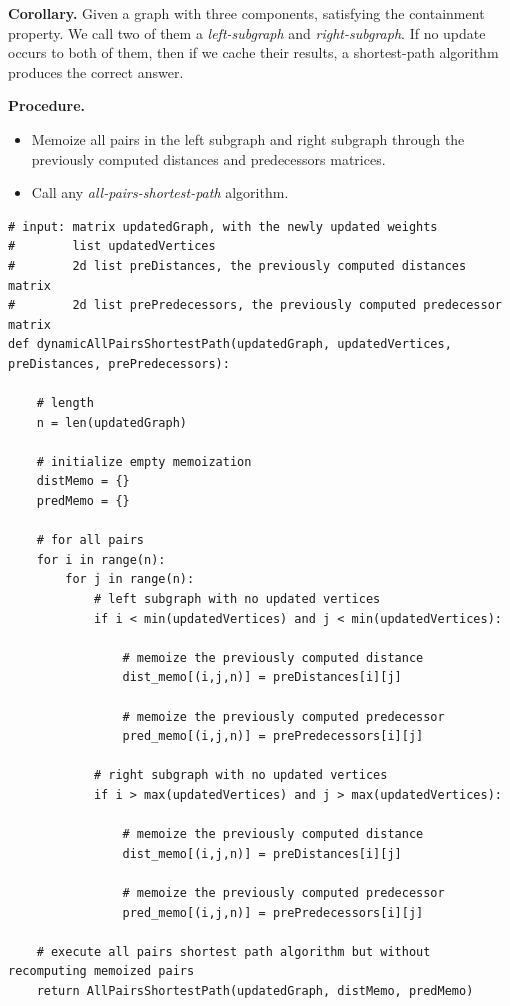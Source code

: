 \textbf{Corollary.} Given a graph with three components, satisfying the containment property. We call two of them a \textit{left-subgraph} and \textit{right-subgraph}. If no update occurs to both of them, then if we cache their results, a shortest-path algorithm produces the correct answer.

\textbf{Procedure.}
\begin{itemize}
    \item Memoize all pairs in the left subgraph and right subgraph through the previously computed distances and predecessors matrices.
    \item Call any \textit{all-pairs-shortest-path} algorithm.
\end{itemize}

\begin{verbatim}
# input: matrix updatedGraph, with the newly updated weights
#        list updatedVertices
#        2d list preDistances, the previously computed distances matrix
#        2d list prePredecessors, the previously computed predecessor matrix
def dynamicAllPairsShortestPath(updatedGraph, updatedVertices, preDistances, prePredecessors):
    
    # length
    n = len(updatedGraph)
    
    # initialize empty memoization
    distMemo = {}
    predMemo = {}
    
    # for all pairs
    for i in range(n):
        for j in range(n):
            # left subgraph with no updated vertices
            if i < min(updatedVertices) and j < min(updatedVertices):
            
                # memoize the previously computed distance
                dist_memo[(i,j,n)] = preDistances[i][j]
                
                # memoize the previously computed predecessor
                pred_memo[(i,j,n)] = prePredecessors[i][j]
            
            # right subgraph with no updated vertices
            if i > max(updatedVertices) and j > max(updatedVertices):
            
                # memoize the previously computed distance
                dist_memo[(i,j,n)] = preDistances[i][j]
                
                # memoize the previously computed predecessor
                pred_memo[(i,j,n)] = prePredecessors[i][j]
    
    # execute all pairs shortest path algorithm but without recomputing memoized pairs
    return AllPairsShortestPath(updatedGraph, distMemo, predMemo)
\end{verbatim}

